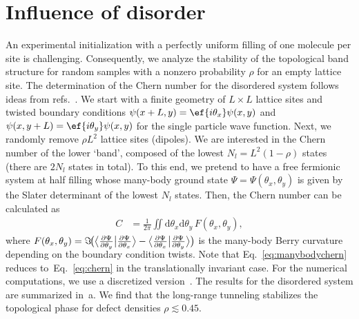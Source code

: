 \section{Influence of disorder}

An experimental initialization with a perfectly uniform filling of one molecule per site is challenging.
Consequently, we analyze the stability of the topological band structure for random samples with a nonzero probability $\rho$ for an empty lattice site.
The determination of the Chern number for the disordered system follows ideas from refs.~\cite{Niu1985,Avron1985}.
We start with a finite geometry of $L \times L$ lattice sites and twisted boundary conditions
$\psi(x + L, y) = \ef{i\theta_x}\psi(x, y)$ and $\psi(x, y + L) = \ef{i\theta_y}\psi(x, y)$ for the single particle wave function.
Next, we randomly remove $\rho L^2$ lattice sites (dipoles).
We are interested in the Chern number of the lower `band', composed of the lowest $N_l=L^2 (1-\rho)$ states (there are $2N_l$ states in total).
To this end, we pretend to have a free fermionic system at half filling whose many-body ground state $\Psi=\Psi(\theta_x, \theta_y)$ is given by the Slater determinant of the lowest $N_l$ states.
Then, the Chern number can be calculated as
\begin{align}
    C &= \frac{1}{2\pi}\iint\!\mathrm{d}\theta_x \mathrm{d}\theta_y \, F(\theta_x, \theta_y), \label{eq:manybodychern}
\end{align}
where $F(\theta_x,\theta_y)=\smash{\Im\!\big({\big\langle\frac{\partial \Psi}{\partial \theta_y}\big|\frac{\partial \Psi}{\partial \theta_x}\big\rangle - \big\langle\frac{\partial \Psi}{\partial \theta_x}\big|\frac{\partial \Psi}{\partial \theta_y}\big\rangle}\big)}$ is the many-body Berry curvature depending on the boundary condition twists.
Note that Eq.~\eqref{eq:manybodychern} reduces to~Eq.~\eqref{eq:chern} in the translationally invariant case.
For the numerical computations, we use a discretized version~\cite{Fukui2005}.
The results for the disordered system are summarized in~a.
We find that the long-range tunneling stabilizes the topological phase for defect densities $\rho\lesssim 0.45$.

